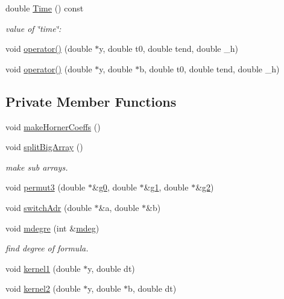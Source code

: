\begin{DoxyCompactItemize}
double \hyperlink{classodes_1_1Rock4L_a906190dde91ef28c3e8e2f9b3088c6cb}{Time} () const 
\begin{DoxyCompactList}\small\item\em value of \char`\"{}time\char`\"{}\-: \end{DoxyCompactList}\item 
void \hyperlink{classodes_1_1Rock4L_acf3b169f7cad01c6bb76f3065bb89637}{operator()} (double $\ast$y, double t0, double tend, double \-\_\-h)
\item 
void \hyperlink{classodes_1_1Rock4L_af91e73e215934088fc9a87dbe489abc3}{operator()} (double $\ast$y, double $\ast$b, double t0, double tend, double \-\_\-h)
\end{DoxyCompactItemize}
\subsection*{Private Member Functions}
\begin{DoxyCompactItemize}
\item 
void \hyperlink{classodes_1_1Rock4L_afd2437fba1cec2c4ffcef33b6234a91f}{make\-Horner\-Coeffs} ()
\item 
void \hyperlink{classodes_1_1Rock4L_a17f87c095ebb1a8f682d1e7b76279951}{split\-Big\-Array} ()
\begin{DoxyCompactList}\small\item\em make sub arrays. \end{DoxyCompactList}\item 
void \hyperlink{classodes_1_1Rock4L_a39083eaebdfcf2643ee2d3d268fb0a98}{permut3} (double $\ast$\&\hyperlink{classodes_1_1Rock4L_a932667ae7d13758c5d2fd1eec72fd0f1}{g0}, double $\ast$\&\hyperlink{classodes_1_1Rock4L_aa4175c5f417df3a94536932f085e6a53}{g1}, double $\ast$\&\hyperlink{classodes_1_1Rock4L_ae54c397e14b9def73420e3e52cb4f4f7}{g2})
\item 
void \hyperlink{classodes_1_1Rock4L_a6bd321711dde8ea07c05f1fa0753f1da}{switch\-Adr} (double $\ast$\&a, double $\ast$\&b)
\item 
void \hyperlink{classodes_1_1Rock4L_a6bdaad118454e394f98d7e50652886bf}{mdegre} (int \&\hyperlink{classodes_1_1Rock4L_af7dc55d28288c0d21d8be9a21ec476a0}{mdeg})
\begin{DoxyCompactList}\small\item\em find degree of formula. \end{DoxyCompactList}\item 
void \hyperlink{classodes_1_1Rock4L_acb848422ae9f2d5ff751d394d407fe5f}{kernel1} (double $\ast$y, double dt)
\item 
void \hyperlink{classodes_1_1Rock4L_a6f4dc567991ebb3a0e65b0e9a477b28f}{kernel2} (double $\ast$y, double $\ast$b, double dt)
\end{DoxyCompactItemize}
